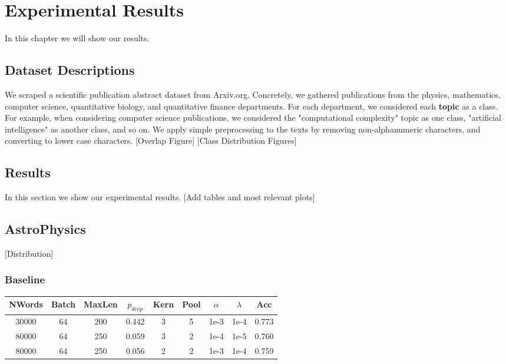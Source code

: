 
\chapter{Experimental Results} \label{Results}
In this chapter we will show our results.

\section{Dataset Descriptions}

We scraped a scientific publication abstract dataset from Arxiv.org. Concretely, we gathered
publications from the physics, mathematics, computer science, quantitative biology,
and quantitative finance departments. For each department, we considered each \textbf{topic} as a
class. For example, when considering computer science publications, we considered the
"computational complexity" topic as one class, "artificial intelligence" as another class,
and so on. We apply simple preprocessing to the texts by removing non-alphanumeric
characters, and converting to lower case characters. [Overlap Figure] [Class Distribution
Figures]

\section{Results}
In this section we show our experimental results. [Add tables and most relevant plots]

%
%
\section{AstroPhysics}
[Distribution]
\subsection{Baseline}
\begin{center}\begin{tabular}{||c c c c c c c c c||}
 \hline
 NWords & Batch & MaxLen & $p_{drop}$ & Kern & Pool & $\alpha$ & $\lambda$ & Acc\\ [0.5ex]
 \hline\hline
 30000 & 64 & 200 & 0.442 & 3 & 5 & 1e-3 & 1e-4 & 0.773\\
 \hline
 80000 & 64 & 250 & 0.059 & 3 & 2 & 1e-4 & 1e-5 & 0.760\\
 \hline
 80000 & 64 & 250 & 0.056 & 2 & 2 & 1e-3 & 1e-4 & 0.759\\
 [1ex]\hline\end{tabular}\end{center}

